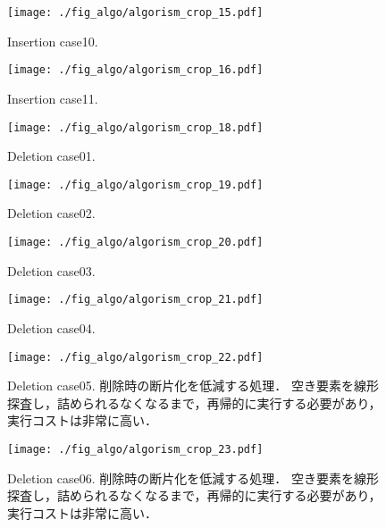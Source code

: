 \begin{figure}[h]
  \texttt{[image: ./fig\_algo/algorism\_crop\_15.pdf]}
  \caption{ Insertion case10. }
  \label{fig_IpCHashT_insert_hard_case10}
\end{figure}

\begin{figure}[h]
  \texttt{[image: ./fig\_algo/algorism\_crop\_16.pdf]}
  \caption{ Insertion case11. }
  \label{fig_IpCHashT_insert_hard_case11}
\end{figure}


\begin{figure}[h]
  \texttt{[image: ./fig\_algo/algorism\_crop\_18.pdf]}
  \caption{ Deletion case01. }
  \label{fig_IpCHashT_deletion_case01}
\end{figure}

\begin{figure}[h]
  \texttt{[image: ./fig\_algo/algorism\_crop\_19.pdf]}
  \caption{ Deletion case02. }
  \label{fig_IpCHashT_deletion_case02}
\end{figure}

\begin{figure}[h]
  \texttt{[image: ./fig\_algo/algorism\_crop\_20.pdf]}
  \caption{ Deletion case03. }
  \label{fig_IpCHashT_deletion_case03}
\end{figure}

\begin{figure}[h]
  \texttt{[image: ./fig\_algo/algorism\_crop\_21.pdf]}
  \caption{ Deletion case04. }
  \label{fig_IpCHashT_deletion_case04}
\end{figure}

\begin{figure}[h]
  \texttt{[image: ./fig\_algo/algorism\_crop\_22.pdf]}
  \caption{
    Deletion case05.
    削除時の断片化を低減する処理．
    空き要素を線形探査し，詰められるなくなるまで，再帰的に実行する必要があり，実行コストは非常に高い．
  }
  \label{fig_IpCHashT_deletion_case05}
\end{figure}

\begin{figure}[h]
  \texttt{[image: ./fig\_algo/algorism\_crop\_23.pdf]}
  \caption{
    Deletion case06.
    削除時の断片化を低減する処理．
    空き要素を線形探査し，詰められるなくなるまで，再帰的に実行する必要があり，実行コストは非常に高い．
  }
  \label{fig_IpCHashT_deletion_case06}
\end{figure}


